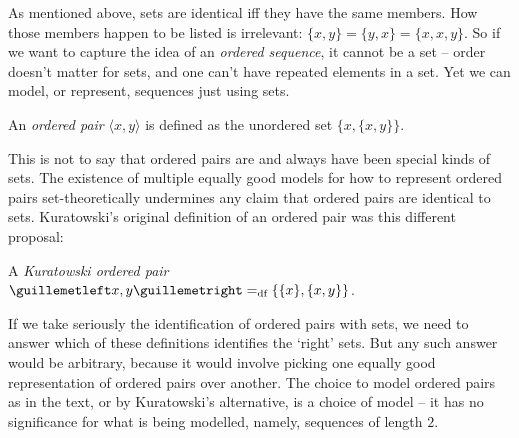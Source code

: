 As mentioned above, sets are identical iff they have the same members. How those members happen to be listed is irrelevant: $\{x,y\}=\{y,x\}=\{x,x,y\}$. So if we want to capture the idea of an \emph{ordered sequence}, it cannot be a set – order doesn't matter for sets, and one can't have repeated elements in a set. Yet we can model, or represent, sequences just using sets.
\begin{definition} An \emph{ordered pair} $\langle x, y \rangle$ is defined as the unordered set $\bigl\{x,\{x,y\}\bigr\}$.
\end{definition}
This is not to say that ordered pairs are and always have been special kinds of sets. The existence of multiple equally good models for how to represent ordered pairs set-theoretically undermines any claim that ordered pairs are identical to sets. Kuratowski's original definition of an ordered pair was this different proposal:
\begin{definition} A \emph{Kuratowski ordered pair} $«x,y» \eqdf \{\{x\},\{x,y\}\}$.
\end{definition}
 If we take seriously the identification of ordered pairs with sets, we need to answer which of these definitions identifies the `right' sets. But any such answer would be arbitrary, because it would involve picking one equally good representation of ordered pairs over another. The choice to model ordered pairs as in the text, or by Kuratowski's alternative, is a choice of model – it has no significance for what is being modelled, namely, sequences of length $2$.

